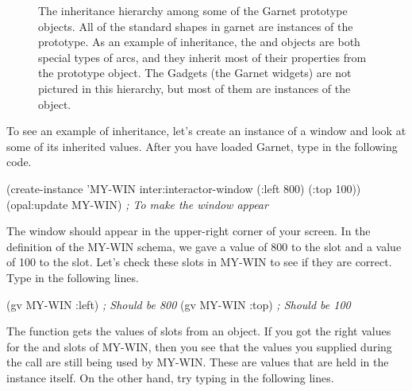 \begin{figure}
  \begin{center}
\begin{makeimage}
\end{makeimage}
\begin{latexonly}
\end{latexonly}
  \end{center}
\caption{The inheritance hierarchy among some of the Garnet prototype objects.
All of the standard shapes in garnet are instances of the
 prototype.  As an example of inheritance, the
 and  objects are both special types of arcs, and
they inherit most of their properties from the  prototype
object.  The Gadgets (the Garnet widgets) are not pictured in this
hierarchy, but most of them are instances of the  object.}
\end{figure}

To see an example of inheritance, let's create an instance of a window
and look at some of its inherited values.  After you have loaded Garnet,
type in the following code.

\begin{programexample}
(create-instance 'MY-WIN inter:interactor-window
   (:left 800) (:top 100))
(opal:update MY-WIN)  {\it ; To make the window appear}
\end{programexample}

The window should appear in the upper-right corner of your screen.
In the definition of the MY-WIN schema, we gave a value of 800 to the
 slot and a value of 100 to the  slot.  Let's check
these slots in MY-WIN to see if they are correct.  Type in the
following lines.

\begin{programexample}
(gv MY-WIN :left)    {\it ; Should be 800}
(gv MY-WIN :top)     {\it ; Should be 100}
\end{programexample}

The function  gets the values of slots from an object.
If you got the right values for the  and  slots of
MY-WIN, then you see that the values you supplied during the
 call are still being used by MY-WIN.  These are values
that are held in the instance itself.  On the other hand, try typing
in the following lines.

